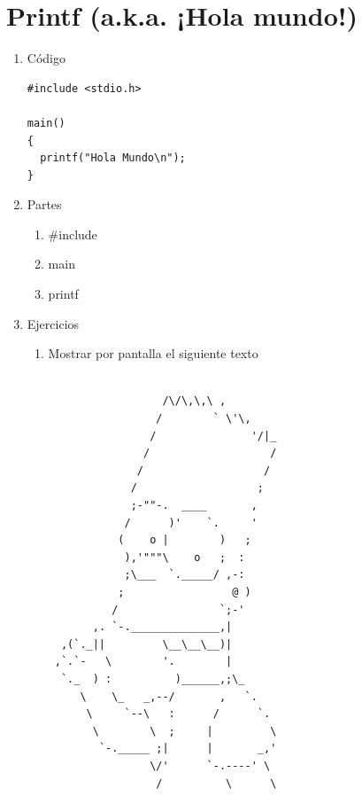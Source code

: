 \documentclass[a4paper,oneside]{article}
\begin{document}
\section{Printf (a.k.a. ¡Hola mundo!)}
  \begin{enumerate}
  \item Código

    \begin{verbatim}
#include <stdio.h>

main()
{
  printf("Hola Mundo\n");
}
    \end{verbatim}
  \item Partes
    \begin{enumerate}
      \item \#include
      \item main
      \item printf
    \end{enumerate}
  \item Ejercicios
    \begin{enumerate}
      \item Mostrar por pantalla el siguiente texto

      \begin{verbatim}

                  /\/\,\,\ , 
                 /        ` \'\, 
                /               '/|_ 
               /                   / 
              /                   / 
             /                   ; 
             ;-""-.  ____       , 
            /      )'    `.     ' 
           (    o |        )   ; 
            ),'"""\    o   ;  : 
            ;\___  `._____/ ,-: 
           ;                 @ ) 
          /                `;-' 
       ,. `-.______________,| 
  ,(`._||         \__\__\__)| 
 ,`.`-   \        '.        | 
  `._  ) :          )______,;\_ 
     \    \_   _,--/       ,   `. 
      \     `--\   :      /      `. 
       \        \  ;     |         \ 
        `-._____ ;|      |       _,' 
                \/'      `-.----' \ 
                 /          \      \ 

      \end{verbatim}
    \end{enumerate}
  \end{enumerate}
\end{document}
